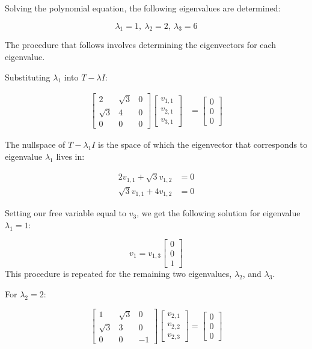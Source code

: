 Solving the polynomial equation, the following eigenvalues are determined:

$$
\lambda_{1}=1,\ \lambda_{2}=2,\ \lambda_{3}=6
$$

The procedure that follows involves determining the eigenvectors for each eigenvalue. 

Substituting $\lambda_{1}$ into $T-\lambda I$:


\begin{align*}
\begin{bmatrix}
2 & \sqrt{ 3 } & 0 \\
\sqrt{ 3 } & 4 & 0 \\
0 & 0 & 0
\end{bmatrix}\begin{bmatrix}
v_{1,1} \\
v_{2,1} \\
v_{3,1}
\end{bmatrix}&=\begin{bmatrix}
0 \\
0 \\
0
\end{bmatrix}
\end{align*}


The nullspace of $T-\lambda_{1}I$ is the space of which the eigenvector that corresponds to eigenvalue $\lambda_{1}$ lives in:

\begin{align*}
2v_{1,1}+\sqrt{ 3 }v_{1,2}&=0\\[10pt]
\sqrt{ 3 }v_{1,1}+4v_{1,2}&=0
\end{align*}


Setting our free variable equal to $v_{3}$, we get the following solution for eigenvalue $\lambda_{1}=1$:

$$
v_{1}=v_{1,3}\begin{bmatrix}
0 \\
0 \\
1
\end{bmatrix}
$$
This procedure is repeated for the remaining two eigenvalues, $\lambda_2$, and $\lambda_{3}$.

For $\lambda_{2}=2$:

$$
\begin{bmatrix}
1 & \sqrt{ 3 } & 0 \\
\sqrt{ 3 } & 3 & 0 \\
0 & 0 & -1
\end{bmatrix}\begin{bmatrix}
v_{2,1} \\
v_{2,2} \\
v_{2,3}
\end{bmatrix}=\begin{bmatrix}
0 \\
0 \\
0
\end{bmatrix}
$$

